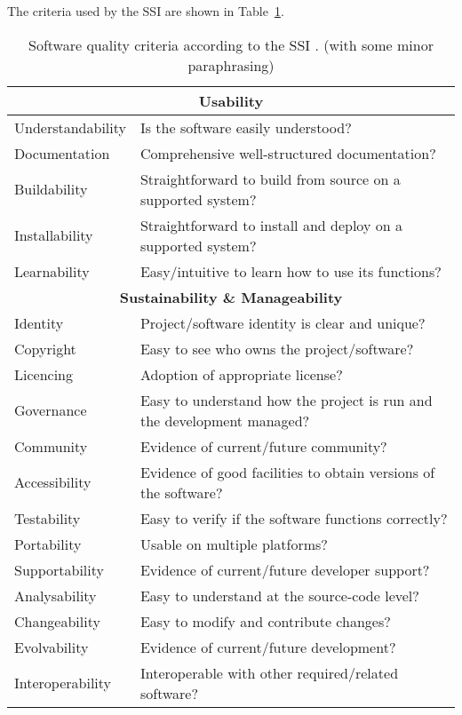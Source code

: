 \documentclass[a4paper,11pt]{article}
\begin{document}
The criteria used by the SSI are shown in Table~\ref{tab:criteria}.

\begin{table}[hbt]
\begin{tabular}{l|l}
\hline
\multicolumn{2}{c}{\textbf{Usability}} \\
\hline
Understandability & Is the software easily understood? \\ 
Documentation & Comprehensive well-structured documentation? \\
Buildability  & Straightforward to build from source on a supported system? \\
Installability  & Straightforward to install and deploy on a supported system? \\
Learnability & Easy/intuitive to learn how to use its functions? \\
\hline
\multicolumn{2}{c}{\textbf{Sustainability \& Manageability}} \\
\hline
Identity & Project/software identity is clear and unique? \\
Copyright & Easy to see who owns the project/software? \\
Licencing & Adoption of appropriate license? \\
Governance & Easy to understand how the project is run and the development managed? \\
Community & Evidence of current/future community? \\
Accessibility & Evidence of good facilities to obtain versions of the software? \\
Testability & Easy to verify if the software functions correctly? \\
Portability & Usable on multiple platforms? \\
Supportability & Evidence of current/future developer support? \\
Analysability & Easy to understand at the source-code level? \\
Changeability & Easy to modify and contribute changes? \\
Evolvability & Evidence of current/future development? \\
Interoperability & Interoperable with other required/related software? \\
\end{tabular}
\caption{Software quality criteria according to the SSI \citep{SSIGUIDE}. (with some minor paraphrasing)}
\label{tab:criteria}
\end{table}
\end{document}
